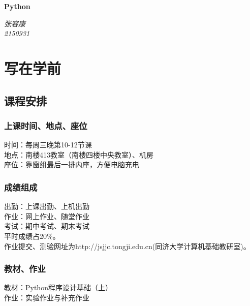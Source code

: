 \documentclass{book}%
\begin{document}
	
	\setlength{\parindent}{0pt}%
	\begin{titlepage}%
		\vspace*{\fill}
		
		\begin{center}
		\normalfont%
		{\huge\bfseries Python}
		
		\bigskip
		{\Large\itshape 张容康\\2150931}
	\end{center}
    \end{titlepage}

	\thispagestyle{fancy}
	\newpage
	\let\cleardoublepage\clearpage%
	\thispagestyle{empty}%
	\tableofcontents%
	
	\part{写在学前}
	
	\chapter{课程安排}
	
	\section{上课时间、地点、座位}
	时间：每周三晚第10-12节课\\
	地点：南楼413教室（南楼四楼中央教室）、机房\\	
	座位：靠窗组最后一排内座，方便电脑充电\\
	
	\section{成绩组成}
	出勤：上课出勤、上机出勤\\
	作业：网上作业、随堂作业\\
	考试：期中考试、期末考试\\
	平时成绩占20\%。\\
	作业提交、测验网址为http://jsjjc.tongji.edu.cn(同济大学计算机基础教研室)。\\
	
	\section{教材、作业}
	教材：Python程序设计基础（上）\\
	作业：实验作业与补充作业\\
	
\end{document}
